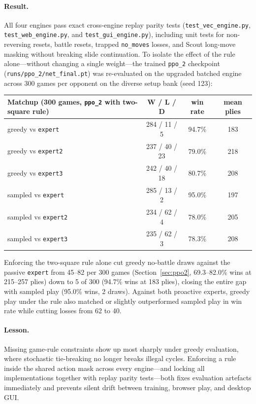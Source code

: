 \paragraph{Result.} All four engines pass exact cross-engine replay parity tests
(\texttt{test\_vec\_engine.py}, \texttt{test\_web\_engine.py}, and \texttt{test\_gui\_engine.py}),
including unit tests for non-reversing resets, battle resets, trapped \texttt{no\_moves} losses,
and Scout long-move masking without breaking slide continuation. To isolate the effect of the rule
alone---without changing a single weight---the trained \texttt{ppo\_2} checkpoint
(\texttt{runs/ppo\_2/net\_final.pt}) was re-evaluated on the upgraded batched engine across 300
games per opponent on the diverse setup bank (seed 123):
\begin{center}
\small
\begin{tabular}{lccc}
\toprule
Matchup (300 games, \texttt{ppo\_2} with two-square rule) & W / L / D & win rate & mean plies \\
\midrule
greedy vs \texttt{expert}  & 284 / 11 / 5  & 94.7\% & 183 \\
greedy vs \texttt{expert2} & 237 / 40 / 23 & 79.0\% & 218 \\
greedy vs \texttt{expert3} & 242 / 40 / 18 & 80.7\% & 208 \\
sampled vs \texttt{expert}  & 285 / 13 / 2  & 95.0\% & 197 \\
sampled vs \texttt{expert2} & 234 / 62 / 4  & 78.0\% & 205 \\
sampled vs \texttt{expert3} & 235 / 62 / 3  & 78.3\% & 208 \\
\bottomrule
\end{tabular}
\end{center}
Enforcing the two-square rule alone cut greedy no-battle draws against the passive \texttt{expert}
from 45--82 per 300 games (Section~\ref{sec:ppo2}, 69.3--82.0\% wins at 215--257 plies) down to
5 of 300 (94.7\% wins at 183 plies), closing the entire gap with sampled play (95.0\% wins, 2
draws). Against both proactive experts, greedy play under the rule also matched or slightly
outperformed sampled play in win rate while cutting losses from 62 to 40.

\paragraph{Lesson.} Missing game-rule constraints show up most sharply under greedy evaluation,
where stochastic tie-breaking no longer breaks illegal cycles. Enforcing a rule inside the shared
action mask across every engine---and locking all implementations together with replay parity
tests---both fixes evaluation artefacts immediately and prevents silent drift between training,
browser play, and desktop GUI.

